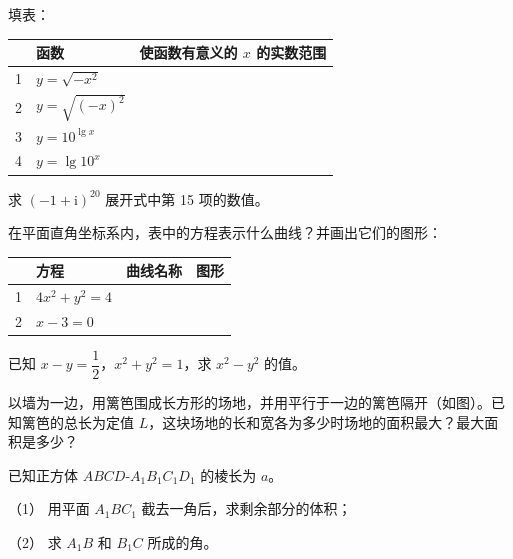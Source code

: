 \begin{question}
填表：

\begin{center}
\begin{tabular}{cll}
\toprule
 & 函数 & 使函数有意义的 $x$ 的实数范围 \\
\midrule
1 & $y=\sqrt{-x^2}$ &  \\
2 & $y=\sqrt{(-x)^2}$ &  \\
3 & $y=10^{\lg x}$ &  \\
4 & $y=\lg 10^x$ &  \\
\bottomrule
\end{tabular}
\end{center}

\end{question}
\begin{question}
求 $(-1+\mathrm i)^{20}$ 展开式中第 15 项的数值。

\end{question}
\begin{question}
在平面直角坐标系内，表中的方程表示什么曲线？并画出它们的图形：

\begin{center}
\begin{tabular}{clll}
\toprule
 & 方程 & 曲线名称 & 图形 \\
\midrule
1 & $4x^2+y^2=4$ &  &  \\
2 & $x-3=0$ &  &  \\
\bottomrule
\end{tabular}
\end{center}

\end{question}
\begin{question}
已知 $x-y=\dfrac12$，$x^2+y^2=1$，求 $x^2-y^2$ 的值。

\Needspace{0.4\textheight}
\end{question}
\begin{question}
以墙为一边，用篱笆围成长方形的场地，并用平行于一边的篱笆隔开（如图）。已知篱笆的总长为定值 $L$，这块场地的长和宽各为多少时场地的面积最大？最大面积是多少？
\nopagebreak[4]
\begin{center}\end{center}
\nopagebreak[4]
\end{question}
\begin{question}
已知正方体 $ABCD\text{-}A_1B_1C_1D_1$ 的棱长为 $a$。

（1） 用平面 $A_1BC_1$ 截去一角后，求剩余部分的体积；

（2） 求 $A_1B$ 和 $B_1C$ 所成的角。

\end{question}
